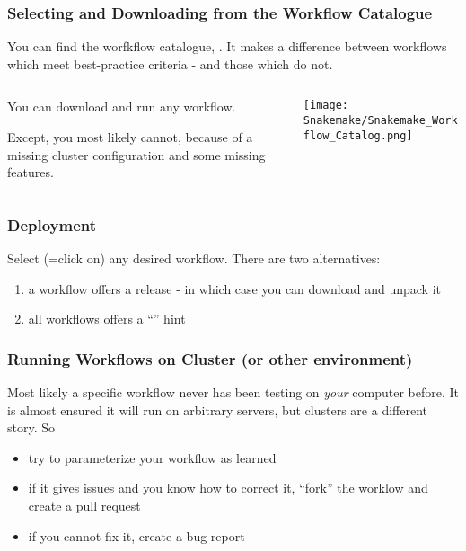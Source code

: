 \begin{frame}
 \frametitle{Selecting and Downloading from the Workflow Catalogue}
 You can find the \Snakemake{} worfkflow catalogue, . It makes a difference between workflows which meet best-practice criteria - and those which do not.\newline
 \begin{columns}
   \begin{column}{0.5\textwidth}
     You can download and run any workflow. \pause\newline
     \begin{warning}
     	Except, you most likely cannot, because of a missing cluster configuration and some missing features.
     \end{warning}
   \end{column}
   \begin{column}{0.5\textwidth}
     \texttt{[image: Snakemake/Snakemake\_Workflow\_Catalog.png]}
   \end{column}
 \end{columns}
\end{frame}

\begin{frame}[fragile]
  \frametitle{Deployment}
  Select (=click on) any desired workflow. There are two alternatives:
  \begin{enumerate}
   \item a workflow offers a release - in which case you can download and unpack it
   \item all workflows offers a ``'' hint
  \end{enumerate}
\end{frame}

\begin{frame}[fragile]
  \frametitle{Running Workflows on Cluster (or other environment)}
  Most likely a specific workflow never has been testing on \emph{your} computer before. It is almost ensured it will run on arbitrary servers, but clusters are a different story. \newline
  So
  \begin{itemize}[<+->]
   \item try to parameterize your workflow as learned
   \item if it gives issues and you know how to correct it, ``fork'' the worklow and create a pull request
   \item if you cannot fix it, create a bug report
  \end{itemize}
\end{frame}

